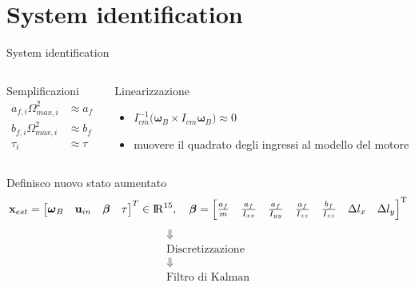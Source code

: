 \documentclass[]{beamer}
\begin{document}
	\section{System identification}
	
	\begin{frame}{System identification}
		\centering
		\begin{columns}
			\begin{column}{.4\textwidth}
				\centering
				\begin{block}{Semplificazioni}
					\setlength\abovedisplayskip{-10pt}
					\begin{align*}
						a_{f,i}\Omega_{max,i}^2 &\approx a_f \\
						b_{f,i}\Omega_{max,i}^2 &\approx b_f \\
						\tau_i &\approx \tau
					\end{align*}
				\end{block}
			\end{column}
			\begin{column}{.6\textwidth}
				\centering
				\begin{block}{Linearizzazione}
					\begin{itemize}
						\item $I_{cm}^{-1}\bigl(\boldsymbol{\omega}_B \times I_{cm} \boldsymbol{\omega}_B \bigl) \approx 0$
						\item muovere il quadrato degli ingressi al modello del motore
					\end{itemize}
				\end{block}
			\end{column}
		\end{columns}
		\centering
		Definisco nuovo stato aumentato
		\tiny
		\begin{equation*}
			\mathbf{x}_{est}=
			\begin{bmatrix}
				\boldsymbol{\omega}_B & \mathbf{u}_{in} & \boldsymbol{\beta} & \tau
			\end{bmatrix}^T
			\in \rm I\!R^{15}, \quad \boldsymbol{\beta}=
			\begin{bmatrix}
				\frac{a_f}{m} & \frac{a_f}{I_{xx}} & \frac{a_f}{I_{yy}} & \frac{a_f}{I_{zz}} & \frac{b_f}{I_{zz}} & \Delta l_x & \Delta l_y 
			\end{bmatrix}^T
		\end{equation*}
		\normalsize
		\begin{gather*}
			\Downarrow \\
			\text{Discretizzazione} \\
			\Downarrow \\
			\text{Filtro di Kalman}
		\end{gather*}
	\end{frame}
	
\end{document}

